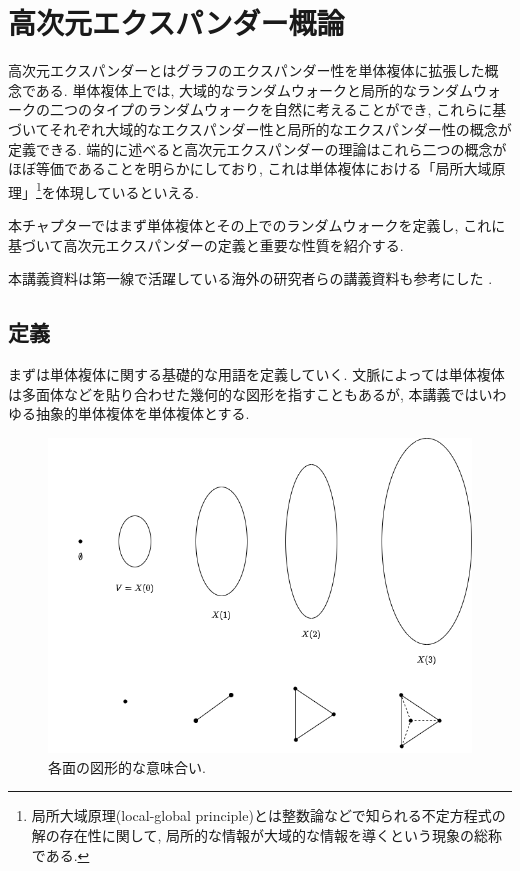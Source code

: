 \chapter{高次元エクスパンダー概論} \label{chap:HDX}
高次元エクスパンダーとはグラフのエクスパンダー性を単体複体に拡張した概念である.
単体複体上では, 大域的なランダムウォークと局所的なランダムウォークの二つのタイプのランダムウォークを自然に考えることができ, これらに基づいてそれぞれ大域的なエクスパンダー性と局所的なエクスパンダー性の概念が定義できる.
端的に述べると高次元エクスパンダーの理論はこれら二つの概念がほぼ等価であることを明らかにしており, これは単体複体における「局所大域原理」\footnote{局所大域原理(local-global principle)とは整数論などで知られる不定方程式の解の存在性に関して, 局所的な情報が大域的な情報を導くという現象の総称である.}を体現しているといえる.

本チャプターではまず単体複体とその上でのランダムウォークを定義し,
これに基づいて高次元エクスパンダーの定義と重要な性質を紹介する.

本講義資料は第一線で活躍している海外の研究者らの講義資料も参考にした \cite{LapChiLau_Lecture,Gharan_Lecture,MaxHopkins_Lecture}.

\section{定義} \label{sec:define simplicial complex}
まずは単体複体に関する基礎的な用語を定義していく.
文脈によっては単体複体は多面体などを貼り合わせた幾何的な図形を指すこともあるが,
本講義ではいわゆる抽象的単体複体を単体複体とする.
\begin{figure}
    \begin{center}
    \includegraphics[width=12cm]{images/face.png}
    \caption{各面の図形的な意味合い. \label{fig:face}}
    \end{center}
\end{figure}

